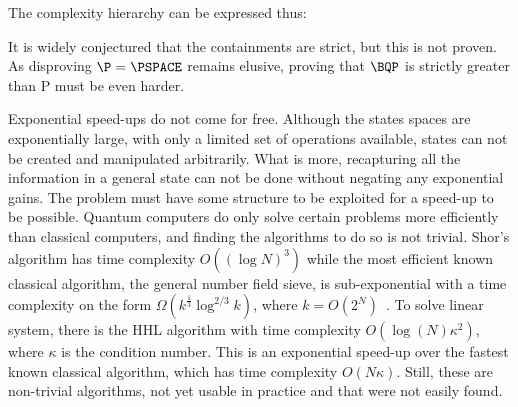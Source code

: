 The complexity hierarchy can be expressed thus:
\begin{center}

\end{center}
It is widely conjectured that the containments are strict, but this is not proven.
As disproving $\P = \PSPACE$ remains elusive, proving that $\BQP$ is strictly greater than P must be even harder.

Exponential speed-ups do not come for free.
Although the states spaces are exponentially large, with only a limited set of operations available, states can not be created and manipulated arbitrarily.
What is more, recapturing all the information in a general state can not be done without negating any exponential gains.
The problem must have some structure to be exploited for a speed-up to be possible.
Quantum computers do only solve certain problems more efficiently than classical computers, and finding the algorithms to do so is not trivial.
Shor's algorithm has time complexity $O((\log N)^3)$ while the most efficient known classical algorithm, the general number field sieve, is sub-exponential with a time complexity on the form $\Omega(k^{\frac{1}{3}}\log^{2/3}k)$, where $k=O(2^N)$~\autocite{dervovic2018}.
To solve linear system, there is the HHL algorithm with time complexity $O(\log(N)\kappa^2)$, where $\kappa$ is the condition number.
This is an exponential speed-up over the fastest known classical algorithm\footnotemark{}, which has time complexity $O(N \kappa)$.
Still, these are non-trivial algorithms, not yet usable in practice and that were not easily found.


